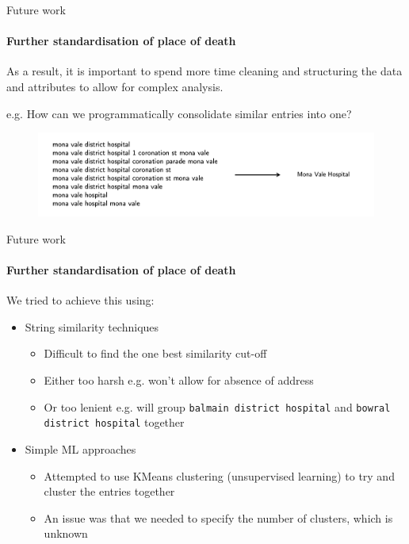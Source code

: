 \documentclass[]{beamer}
\begin{document}

\begin{frame}{Future work}
	\framesubtitle{Further standardisation of place of death}
	As a result, it is important to spend more time cleaning and structuring the data and attributes to allow for complex analysis.

	\vspace{1em}

	e.g. How can we programmatically consolidate similar entries into one?

	\begin{figure}
		\includegraphics[width=\textwidth]{img/deduplication2.png}
	\end{figure}	
\end{frame}

\begin{frame}{Future work}
	\framesubtitle{Further standardisation of place of death}

	We tried to achieve this using:
	\begin{itemize}
		\item String similarity techniques
		\begin{itemize}
			\item Difficult to find the one best similarity cut-off
			\item Either too harsh e.g. won't allow for absence of address
			\item Or too lenient e.g. will group \texttt{balmain district hospital} and \texttt{bowral district hospital} together
		\end{itemize}
		\item Simple ML approaches
		\begin{itemize}
			\item Attempted to use KMeans clustering (unsupervised learning) to try and cluster the entries together
			\item An issue was that we needed to specify the number of clusters, which is unknown
		\end{itemize}
	\end{itemize}

\end{frame}
\end{document}
